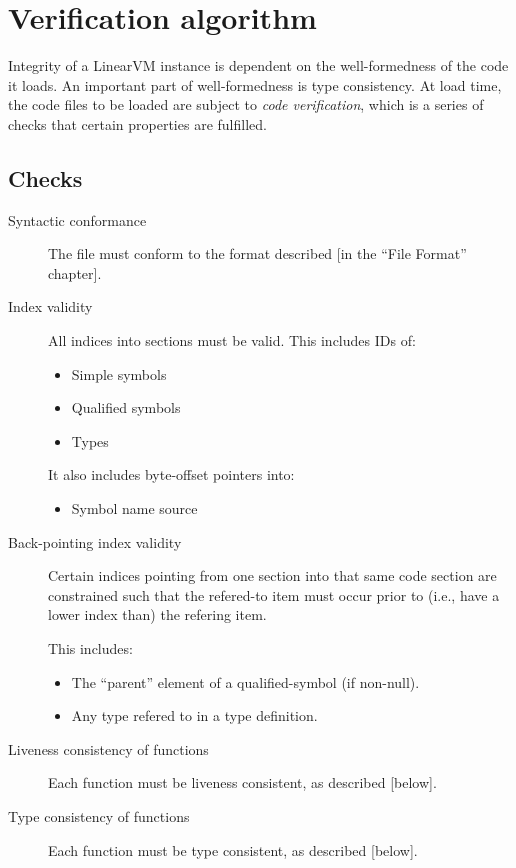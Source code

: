 \documentclass[a4paper]{report}
\begin{document}
\chapter{Verification algorithm}
\label{chap:verifier}

Integrity of a LinearVM instance is dependent on the well-formedness
of the code it loads.
An important part of well-formedness is type consistency.
At load time, the code files to be loaded are subject to \emph{code
  verification}, which is a series of checks that certain properties are fulfilled.

\section{Checks}

\begin{description}
\item[Syntactic conformance]
  The file must conform to the format described [in the ``File Format'' chapter].
\item[Index validity]
  All indices into sections must be valid.
  This includes IDs of:
  \begin{itemize}
  \item Simple symbols
  \item Qualified symbols
  \item Types
  \end{itemize}

  It also includes byte-offset pointers into:
  \begin{itemize}
  \item Symbol name source
  \end{itemize}
\item[Back-pointing index validity]
  Certain indices pointing from one section into that same code
  section are constrained such that the refered-to item must occur
  prior to (i.e., have a lower index than) the refering item.

  This includes:
  \begin{itemize}
  \item The ``parent'' element of a qualified-symbol (if non-null).
  \item Any type refered to in a type definition.
  \end{itemize}
\item[Liveness consistency of functions]
  Each function must be liveness consistent, as described [below].
\item[Type consistency of functions]
  Each function must be type consistent, as described [below].
\end{description}
\end{document}
